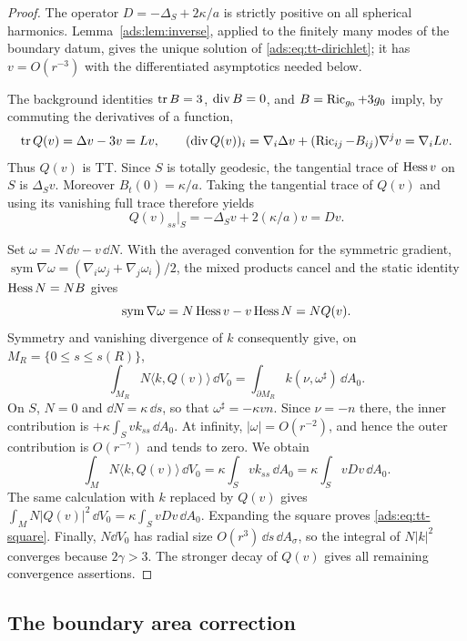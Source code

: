 \begin{proof}
The operator $D=-\Delta_S+2\kappa/a$ is strictly positive on all spherical
harmonics.  Lemma~\ref{ads:lem:inverse}, applied to the finitely many modes of
the boundary datum, gives the unique solution of
\eqref{ads:eq:tt-dirichlet}; it has $v=O(r^{-3})$ with the differentiated
asymptotics needed below.

The background identities $\operatorname{tr} B=3$, $\operatorname{div} B=0$, and
$B=\operatorname{Ric}_{g_0}+3g_0$ imply, by commuting the derivatives of a function,
\[
 \operatorname{tr} Q(v)=\Delta v-3v=Lv,
 \qquad
 (\operatorname{div} Q(v))_i
 =\nabla_i\Delta v+(\operatorname{Ric}_{ij}-B_{ij})\nabla^jv
 =\nabla_iLv.
\]
Thus $Q(v)$ is TT.  Since $S$ is totally geodesic, the tangential trace of
$\operatorname{Hess} v$ on $S$ is $\Delta_Sv$.  Moreover $B_t(0)=\kappa/a$.
Taking the tangential trace of $Q(v)$ and using its vanishing full trace
therefore yields
\begin{equation}
 Q(v)_{ss}|_S=-\Delta_Sv+2(\kappa/a)v=Dv.
 \label{ads:eq:q-normal-boundary}
\end{equation}

Set $\omega=N\,\dd v-v\,\dd N$.  With the averaged convention for
the symmetric gradient, $\operatorname{sym}\nabla\omega
=(\nabla_i\omega_j+\nabla_j\omega_i)/2$, the mixed products cancel and
the static identity $\operatorname{Hess} N=NB$ gives
\[
 \operatorname{sym}\nabla\omega
 =N\operatorname{Hess} v-v\operatorname{Hess} N=NQ(v).
\]
Symmetry and vanishing divergence of $k$ consequently give, on
$M_R=\{0\leq s\leq s(R)\}$,
\[
 \int_{M_R}N\langle k,Q(v)\rangle\,\dd V_0
 =\int_{\partial M_R}k(\nu,\omega^\sharp)\,\dd A_0.
\]
On $S$, $N=0$ and $\dd N=\kappa\,\dd s$, so that
$\omega^\sharp=-\kappa vn$.  Since $\nu=-n$ there, the inner contribution
is $+\kappa\int_Svk_{ss}\,\dd A_0$.  At infinity,
$|\omega|=O(r^{-2})$, and hence the outer contribution is
$O(r^{-\gamma})$ and tends to zero.  We obtain
\begin{equation}
 \int_M N\langle k,Q(v)\rangle\,\dd V_0
 =\kappa\int_Svk_{ss}\,\dd A_0
 =\kappa\int_SvDv\,\dd A_0.
 \label{ads:eq:tt-pairing}
\end{equation}
The same calculation with $k$ replaced by $Q(v)$ gives
$\int_MN|Q(v)|^2\,\dd V_0=\kappa\int_SvDv\,\dd A_0$.
Expanding the square proves \eqref{ads:eq:tt-square}.
Finally, $N\dd V_0$ has radial size $O(r^3)\,\dd s\,\dd A_\sigma$,
so the integral of $N|k|^2$ converges because $2\gamma>3$.
The stronger decay of $Q(v)$ gives all remaining convergence assertions.
\end{proof}

\subsection{The boundary area correction}

